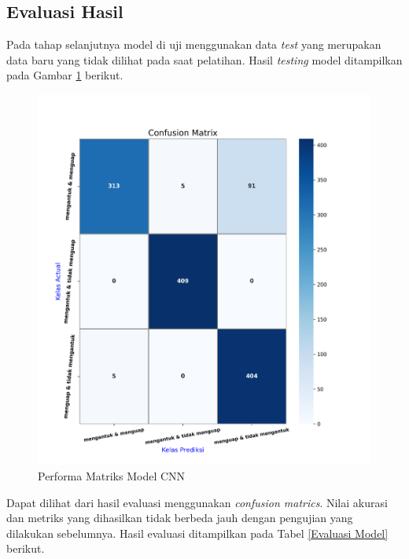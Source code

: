   \subsection{Evaluasi Hasil}

        Pada tahap selanjutnya model di uji menggunakan data \textit{test} yang merupakan data baru yang tidak dilihat pada saat pelatihan. Hasil \textit{testing} model ditampilkan pada Gambar \ref{akurasi model terbaik} berikut.

          \begin{figure}[H]
              \centering
              \includegraphics[width=0.75\linewidth]{figures/bab4/confusion matriks.png}
              \caption{Performa Matriks Model CNN}
              \label{akurasi model terbaik}
          \end{figure}

        Dapat dilihat dari hasil evaluasi menggunakan \textit{confusion matrics}. Nilai akurasi dan metriks yang dihasilkan tidak berbeda jauh dengan pengujian yang dilakukan sebelumnya. Hasil evaluasi ditampilkan pada Tabel \ref{Evaluasi Model} berikut.


